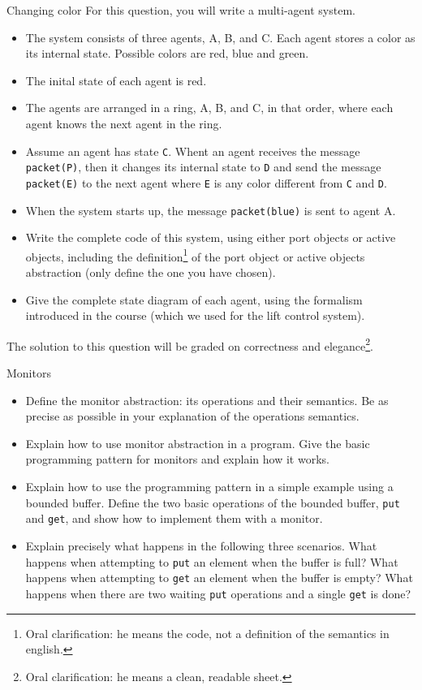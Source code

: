 \begin{Q2}{Changing color}
  For this question, you will write a multi-agent system.
  \begin{itemize}
    \item The system consists of three agents, A, B, and C.
      Each agent stores a color as its internal state.
      Possible colors are red, blue and green.
    \item The inital state of each agent is red.
    \item The agents are arranged in a ring, A, B, and C,
      in that order, where each agent knows the next agent in the ring.
    \item Assume an agent has state \lstinline|C|.
      Whent an agent receives the message \lstinline|packet(P)|,
      then it changes its internal state to \lstinline|D| and
      send the message \lstinline|packet(E)| to the next agent
      where \lstinline|E| is any color different from \lstinline|C| and \lstinline|D|.
    \item When the system starts up, the message \lstinline|packet(blue)| is sent to agent A.
    \item Write the complete code of this system, using either port objects or active objects,
      including the definition\footnote{Oral clarification: he means the code, not a definition of the semantics in english.}
      of the port object or active objects abstraction (only define the one you have chosen).
    \item Give the complete state diagram of each agent, using the formalism introduced in the course
      (which we used for the lift control system).
  \end{itemize}
  The solution to this question will be graded on correctness and
  elegance\footnote{Oral clarification: he means a clean, readable sheet.}.
\end{Q2}

\begin{Q3}{Monitors}
  \begin{itemize}
    \item Define the monitor abstraction: its operations and their semantics.
      Be as precise as possible in your explanation of the operations semantics.
    \item Explain how to use monitor abstraction in a program.
      Give the basic programming pattern for monitors and explain how it works.
    \item Explain how to use the programming pattern in a simple example using a bounded buffer.
      Define the two basic operations of the bounded buffer,
      \lstinline|put| and \lstinline|get|, and show how to implement them with a monitor.
    \item Explain precisely what happens in the following three scenarios.
      What happens when attempting to \lstinline|put| an element when the buffer is full?
      What happens when attempting to \lstinline|get| an element when the buffer is empty?
      What happens when there are two waiting \lstinline|put| operations and a single \lstinline|get| is done?
  \end{itemize}
\end{Q3}


